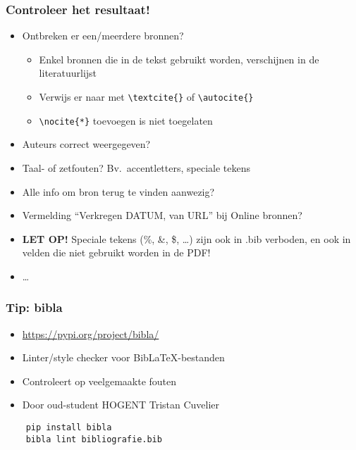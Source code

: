 \documentclass[aspectratio=169]{beamer}
\begin{document}
\begin{frame}[fragile]
  \frametitle{Controleer het resultaat!}

  \begin{itemize}
    \item Ontbreken er een/meerdere bronnen?
      \begin{itemize}
        \item Enkel bronnen die in de tekst gebruikt worden, verschijnen in de literatuurlijst
        \item Verwijs er naar met \verb|\textcite{}| of \verb|\autocite{}|
        \item \verb|\nocite{*}| toevoegen is niet toegelaten
      \end{itemize}
       
    \item Auteurs correct weergegeven?
    \item Taal- of zetfouten? Bv.\ accentletters, speciale tekens
    \item Alle info om bron terug te vinden aanwezig?
    \item Vermelding ``Verkregen DATUM, van URL'' bij Online bronnen?
    \item \textbf{LET OP!} Speciale tekens (\%, \&, \$, \ldots) zijn ook in .bib verboden, en ook in velden die niet gebruikt worden in de PDF!
    \item \ldots
  \end{itemize}

\end{frame}

\begin{frame}[fragile]
  \frametitle{Tip: bibla}

  \begin{itemize}
    \item \url{https://pypi.org/project/bibla/}
    \item Linter/style checker voor BibLaTeX-bestanden
    \item Controleert op veelgemaakte fouten
    \item Door oud-student HOGENT Tristan Cuvelier
  \end{itemize}

  \begin{verbatim}
    pip install bibla
    bibla lint bibliografie.bib
  \end{verbatim}

\end{frame}
\end{document}
